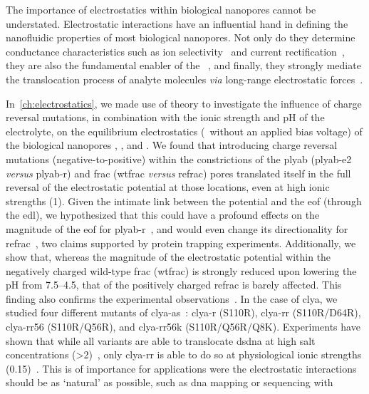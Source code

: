 The importance of electrostatics within biological nanopores cannot be understated. Electrostatic interactions
have an influential hand in defining the nanofluidic properties of most biological nanopores. Not only do they
determine conductance characteristics such as ion selectivity~\cite{Ramirez-2007} and current
rectification~\cite{Wang-2014}, they are also the fundamental enabler of the
~\cite{Bocquet-2010}, and finally, they strongly mediate the translocation process of analyte
molecules \textit{via} long-range electrostatic forces~\cite{Maglia-2008,Asandei-2015b,Fahie-2015b}.

In~\cref{ch:electrostatics}, we made use of  theory to investigate the influence of charge
reversal mutations, in combination with the ionic strength and pH of the electrolyte, on the equilibrium
electrostatics (\ie~without an applied bias voltage) of the biological nanopores ,
, and . We found that introducing charge reversal mutations
(negative-to-positive) within the constrictions of the \gls{plyab} (\gls{plyab-e2} \textit{versus}
\gls{plyab-r}) and \gls{frac} (\gls{wtfrac} \textit{versus} \gls{refrac}) pores translated itself in the full
reversal of the electrostatic potential at those locations, even at high ionic strengths (\SI{1}{\Molar}).
Given the intimate link between the potential and the \gls{eof} (through the \gls{edl}), we hypothesized that
this could have a profound effects on the magnitude of the \gls{eof} for \gls{plyab-r}~\cite{Huang-2020}, and
would even change its directionality for \gls{refrac}~\cite{Huang-2017}, two claims supported by protein
trapping experiments. Additionally, we show that, whereas the magnitude of the electrostatic potential within
the negatively charged wild-type \gls{frac} (\gls{wtfrac}) is strongly reduced upon lowering the pH from
\numrange{7.5}{4.5}, that of the positively charged \gls{refrac} is barely affected. This finding also
confirms the experimental observations~\cite{Huang-2017}. In the case of \gls{clya}, we studied four different
mutants of \gls{clya-as}~\cite{Soskine-2013}: \gls{clya-r} (S110R), \gls{clya-rr} (S110R/D64R),
\gls{clya-rr56} (S110R/Q56R), and \gls{clya-rr56k} (S110R/Q56R/Q8K). Experiments have shown that while all
variants are able to translocate \gls{dsdna} at high salt concentrations
(\SI{>2}{\Molar})~\cite{Franceschini-2013}, only \gls{clya-rr} is able to do so at physiological ionic
strengths (\SI{0.15}{\Molar})~\cite{Franceschini-2016}. This is of importance for applications were the
electrostatic interactions should be as `natural' as possible, such as \gls{dna} mapping or sequencing with
